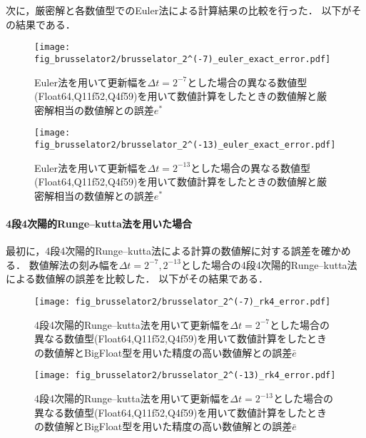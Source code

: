 次に，厳密解と各数値型でのEuler法による計算結果の比較を行った．
以下がその結果である．\\
\begin{figure}[H]
    \centering
    \begin{minipage}[b]{0.49\columnwidth}
        \centering
        \texttt{[image: fig\_brusselator2/brusselator\_2^(-7)\_euler\_exact\_error.pdf]}
        \caption{Euler法を用いて更新幅を$\Delta t = 2^{-7}$とした場合の異なる数値型(Float64,Q11f52,Q4f59)を用いて数値計算をしたときの数値解と厳密解相当の数値解との誤差$e^{\ast}$}
        \label{fig:brusselator_2^(-7)_euler_exact_error}
    \end{minipage}
    \begin{minipage}[b]{0.49\columnwidth}
        \centering
        \texttt{[image: fig\_brusselator2/brusselator\_2^(-13)\_euler\_exact\_error.pdf]}
        \caption{Euler法を用いて更新幅を$\Delta t =  2^{-13}$とした場合の異なる数値型(Float64,Q11f52,Q4f59)を用いて数値計算をしたときの数値解と厳密解相当の数値解との誤差$e^{\ast}$}
        \label{fig:brusselator_2^(-13)_euler_exact_error}
    \end{minipage}
\end{figure}



\paragraph*{4段4次陽的Runge--kutta法を用いた場合}
最初に，4段4次陽的Runge--kutta法による計算の数値解に対する誤差を確かめる．
数値解法の刻み幅を$\Delta t = 2^{-7},2^{-13}$とした場合の4段4次陽的Runge--kutta法による数値解の誤差を比較した．
以下がその結果である．
\begin{figure}[H]
    \centering
    \begin{minipage}[b]{0.49\columnwidth}
        \centering
        \texttt{[image: fig\_brusselator2/brusselator\_2^(-7)\_rk4\_error.pdf]}
        \caption{4段4次陽的Runge--kutta法を用いて更新幅を$\Delta t = 2^{-7}$とした場合の異なる数値型(Float64,Q11f52,Q4f59)を用いて数値計算をしたときの数値解とBigFloat型を用いた精度の高い数値解との誤差$\bar{e}$}
        \label{fig:brusselator_2^(-7)_rk4_error}
    \end{minipage}
    \begin{minipage}[b]{0.49\columnwidth}
        \centering
        \texttt{[image: fig\_brusselator2/brusselator\_2^(-13)\_rk4\_error.pdf]}
        \caption{4段4次陽的Runge--kutta法を用いて更新幅を$\Delta t =  2^{-13}$とした場合の異なる数値型(Float64,Q11f52,Q4f59)を用いて数値計算をしたときの数値解とBigFloat型を用いた精度の高い数値解との誤差$\bar{e}$}
        \label{fig:brusselator_2^(-13)_rk4_error}
    \end{minipage}
\end{figure}

